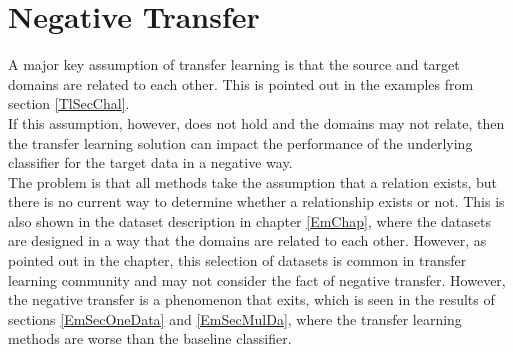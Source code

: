 \section{Negative Transfer}\label{TlSecNeg}
A major key assumption of transfer learning is that the source and target domains are related to each other.
This is pointed out in the examples from section \ref{TlSecChal}.\\
If this assumption, however, does not hold and the domains may not relate, then the transfer learning solution can impact the performance of the underlying classifier for the target data in a negative way.\cite[p. 29]{Weiss.2016}\\
The problem is that all methods take the assumption that a relation exists, but there is no current way to determine whether a relationship exists or not.\cite[p. 1672]{Taylor.2009}
This is also shown in the dataset description in chapter \ref{EmChap}, where the datasets are designed in a way that the domains are related to each other.
However, as pointed out in the chapter, this selection of datasets is common in transfer learning community and may not consider the fact of negative transfer.
However, the negative transfer is a phenomenon that exits, which is seen in the results of sections \ref{EmSecOneData} and \ref{EmSecMulDa}, where the transfer learning methods are worse than the baseline classifier.

